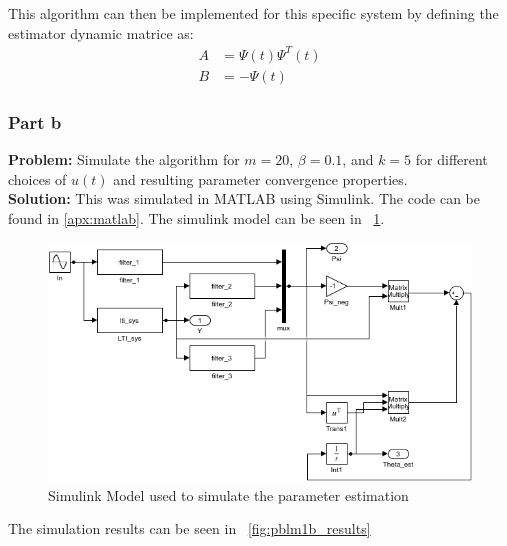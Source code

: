 \documentclass[letter]{article}
\begin{document}
This algorithm can then be implemented for this specific system by defining the estimator dynamic matrice as:
\begin{equation}
	\begin{aligned}
		A &= \Psi(t) \Psi^T(t)\\
		B &= - \Psi(t)
	\end{aligned}
\end{equation}

\newpage
\subsubsection{Part b}
\textbf{Problem:}
Simulate the algorithm for $m = 20$, $\beta = 0.1$, and $k = 5$ for different choices of $u(t)$ and resulting parameter convergence properties.\\

\noindent
\textbf{Solution:}
This was simulated in MATLAB using Simulink. The code can be found in \appendixname \ref{apx:matlab}. The simulink model can be seen in \figurename \ \ref{fig:pblm1b_model}.

\begin{figure}[h]
	\centering
	\includegraphics[width=\linewidth]{fig/sim_model_pblm1b}
	\caption{Simulink Model used to simulate the parameter estimation}
	\label{fig:pblm1b_model}
\end{figure}

\newpage
The simulation results can be seen in \figurename \ \ref{fig:pblm1b_results}
\end{document}
